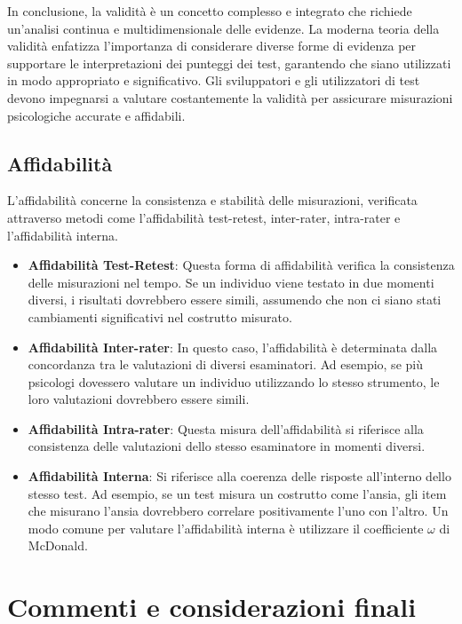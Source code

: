 \documentclass[
  letterpaper,
  DIV=11,
  numbers=noendperiod]{scrreprt}
\theoremstyle{definition}
\theoremstyle{remark}
\begin{document}
In conclusione, la validità è un concetto complesso e integrato che
richiede un'analisi continua e multidimensionale delle evidenze. La
moderna teoria della validità enfatizza l'importanza di considerare
diverse forme di evidenza per supportare le interpretazioni dei punteggi
dei test, garantendo che siano utilizzati in modo appropriato e
significativo. Gli sviluppatori e gli utilizzatori di test devono
impegnarsi a valutare costantemente la validità per assicurare
misurazioni psicologiche accurate e affidabili.

\subsection{Affidabilità}\label{affidabilituxe0}

L'affidabilità concerne la consistenza e stabilità delle misurazioni,
verificata attraverso metodi come l'affidabilità test-retest,
inter-rater, intra-rater e l'affidabilità interna.

\begin{itemize}
\item
  \textbf{Affidabilità Test-Retest}: Questa forma di affidabilità
  verifica la consistenza delle misurazioni nel tempo. Se un individuo
  viene testato in due momenti diversi, i risultati dovrebbero essere
  simili, assumendo che non ci siano stati cambiamenti significativi nel
  costrutto misurato.
\item
  \textbf{Affidabilità Inter-rater}: In questo caso, l'affidabilità è
  determinata dalla concordanza tra le valutazioni di diversi
  esaminatori. Ad esempio, se più psicologi dovessero valutare un
  individuo utilizzando lo stesso strumento, le loro valutazioni
  dovrebbero essere simili.
\item
  \textbf{Affidabilità Intra-rater}: Questa misura dell'affidabilità si
  riferisce alla consistenza delle valutazioni dello stesso esaminatore
  in momenti diversi.
\item
  \textbf{Affidabilità Interna}: Si riferisce alla coerenza delle
  risposte all'interno dello stesso test. Ad esempio, se un test misura
  un costrutto come l'ansia, gli item che misurano l'ansia dovrebbero
  correlare positivamente l'uno con l'altro. Un modo comune per valutare
  l'affidabilità interna è utilizzare il coefficiente \(\omega\) di
  McDonald.
\end{itemize}

\section{Commenti e considerazioni
finali}\label{commenti-e-considerazioni-finali}
\end{document}
